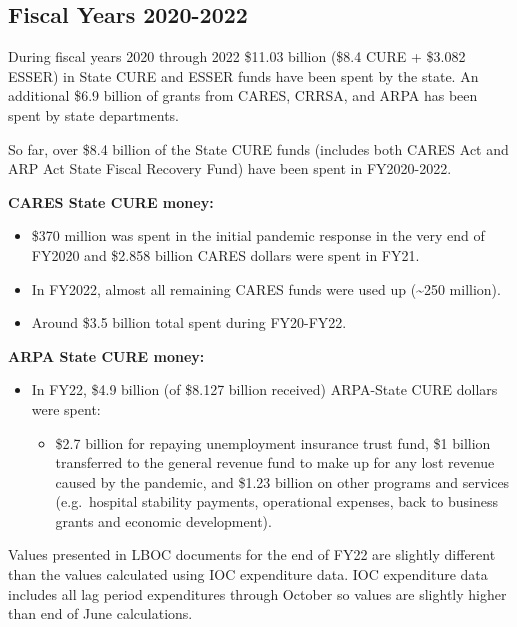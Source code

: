 \documentclass[
  letterpaper,
  DIV=11,
  numbers=noendperiod]{scrreport}
\providecommand{\tightlist}{%
  \setlength{\itemsep}{0pt}\setlength{\parskip}{0pt}}\usepackage{longtable,booktabs,array}
\begin{document}
\hypertarget{fiscal-years-2020-2022}{%
\subsection{Fiscal Years 2020-2022}\label{fiscal-years-2020-2022}}

During fiscal years 2020 through 2022 \$11.03 billion (\$8.4 CURE +
\$3.082 ESSER) in State CURE and ESSER funds have been spent by the
state. An additional \$6.9 billion of grants from CARES, CRRSA, and ARPA
has been spent by state departments.

So far, over \$8.4 billion of the State CURE funds (includes both CARES
Act and ARP Act State Fiscal Recovery Fund) have been spent in
FY2020-2022.

\textbf{CARES State CURE money:}

\begin{itemize}
\tightlist
\item
  \$370 million was spent in the initial pandemic response in the very
  end of FY2020 and \$2.858 billion CARES dollars were spent in FY21.
\item
  In FY2022, almost all remaining CARES funds were used up
  (\textasciitilde250 million).
\item
  Around \$3.5 billion total spent during FY20-FY22.
\end{itemize}

\textbf{ARPA State CURE money:}

\begin{itemize}
\item
  In FY22, \$4.9 billion (of \$8.127 billion received) ARPA-State CURE
  dollars were spent:

  \begin{itemize}
  \tightlist
  \item
    \$2.7 billion for repaying unemployment insurance trust fund, \$1
    billion transferred to the general revenue fund to make up for any
    lost revenue caused by the pandemic, and \$1.23 billion on other
    programs and services (e.g.~hospital stability payments, operational
    expenses, back to business grants and economic development).
  \end{itemize}
\end{itemize}

Values presented in LBOC documents for the end of FY22 are slightly
different than the values calculated using IOC expenditure data. IOC
expenditure data includes all lag period expenditures through October so
values are slightly higher than end of June calculations.
\end{document}
